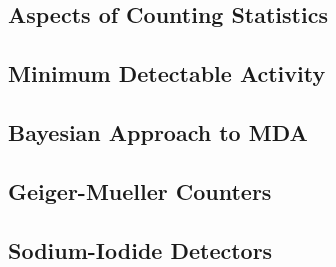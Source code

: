 \subsection{Aspects of Counting Statistics}

\subsection{Minimum Detectable Activity}

\subsection{Bayesian Approach to MDA}

\subsection{Geiger-Mueller Counters}

\subsection{Sodium-Iodide Detectors}